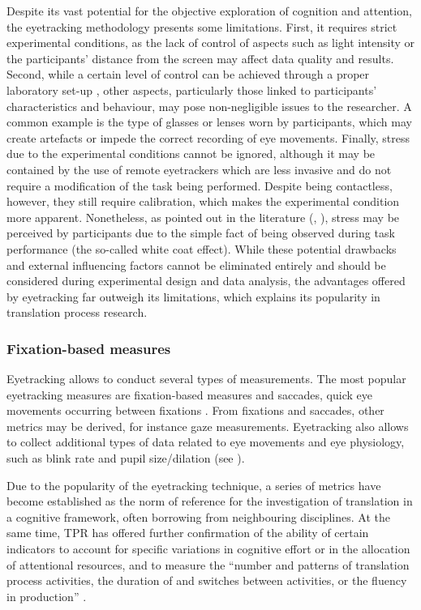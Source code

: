 Despite its vast potential for the objective exploration of cognition and attention, the eyetracking methodology presents some limitations. First, it requires strict experimental conditions, as the lack of control of aspects such as light intensity or the participants' distance from the screen may affect data quality and results. Second, while a certain level of control can be achieved through a proper laboratory set-up \citep{rosener_eye_2016}, other aspects, particularly those linked to participants' characteristics and behaviour, may pose non-negligible issues to the researcher. A common example is the type of glasses or lenses worn by participants, which may create artefacts or impede the correct recording of eye movements. Finally, stress due to the experimental conditions cannot be ignored, although it may be contained by the use of remote eyetrackers which are less invasive and do not require a modification of the task being performed. Despite being contactless, however, they still require calibration, which makes the experimental condition more apparent. Nonetheless, as pointed out in the literature (\citealt[e.g.][206]{hvelplund_eye_2014},  \citealt[390]{hansen_thedialogue_2008}), stress may be perceived by participants due to the simple fact of being observed during task performance (the so-called white coat effect). While these potential drawbacks and external influencing factors cannot be eliminated entirely and should be considered during experimental design and data analysis, the advantages offered by eyetracking far outweigh its limitations, which explains its popularity in translation process research.
\subsubsection{Fixation-based measures} \label{fixations}
Eyetracking allows to conduct several types of measurements. The most popular eyetracking measures are fixation-based measures and saccades, quick eye movements occurring between fixations \citep{poole_eye_2005}. From fixations and saccades, other metrics may be derived, for instance gaze measurements. Eyetracking also allows to collect additional types of data related to eye movements and eye physiology, such as blink rate and pupil size/dilation (see ).

Due to the popularity of the eyetracking technique, a series of metrics have become established as the norm of reference for the investigation of translation in a cognitive framework, often borrowing from neighbouring disciplines. At the same time, TPR has offered further confirmation of the ability of certain indicators to account for specific variations in cognitive effort or in the allocation of attentional resources, and to measure the ``number and patterns of translation process activities, the duration of and switches between activities, or the fluency in production'' \citep[225]{ehrensberger-dow_cognitive_2020}.

